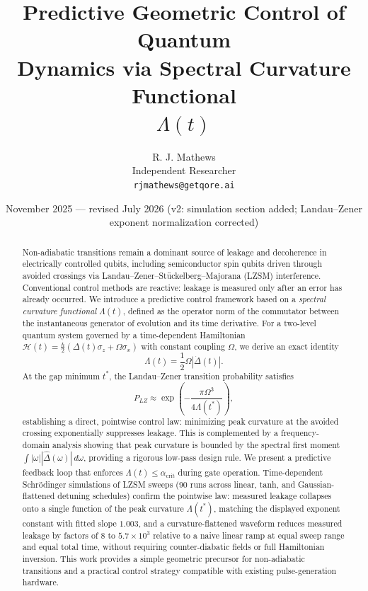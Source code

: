 \documentclass[11pt]{article}
\title{Predictive Geometric Control of Quantum\\
Dynamics via Spectral Curvature Functional\\
$\Lambda(t)$}
\author{R. J. Mathews\\
Independent Researcher\\
\texttt{rjmathews@getqore.ai}}
\date{November 2025 --- revised July 2026 (v2: simulation section added; Landau--Zener exponent normalization corrected)}
\begin{document}
\maketitle

\begin{abstract}
Non-adiabatic transitions remain a dominant source of leakage and decoherence in electrically controlled qubits, including semiconductor spin qubits driven through avoided crossings via Landau--Zener--St\"uckelberg--Majorana (LZSM) interference. Conventional control methods are reactive: leakage is measured only after an error has already occurred. We introduce a predictive control framework based on a \emph{spectral curvature functional} $\Lambda(t)$, defined as the operator norm of the commutator between the instantaneous generator of evolution and its time derivative. For a two-level quantum system governed by a time-dependent Hamiltonian $\mathcal{H}(t) = \frac{\hbar}{2}(\Delta(t)\sigma_z + \Omega \sigma_x)$ with constant coupling $\Omega$, we derive an exact identity
\[
    \Lambda(t) = \frac{1}{2}\Omega |\dot{\Delta}(t)|.
\]
At the gap minimum $t^*$, the Landau--Zener transition probability satisfies
\[
    P_{LZ} \approx \exp\left(-\frac{\pi\Omega^3}{4\Lambda(t^*)}\right),
\]
establishing a direct, pointwise control law: minimizing peak curvature at the avoided crossing exponentially suppresses leakage. This is complemented by a frequency-domain analysis showing that peak curvature is bounded by the spectral first moment $\int |\omega| |\hat{\Delta}(\omega)|\, d\omega$, providing a rigorous low-pass design rule. We present a predictive feedback loop that enforces $\Lambda(t) \le \alpha_{\mathrm{crit}}$ during gate operation. Time-dependent Schr\"odinger simulations of LZSM sweeps (90 runs across linear, tanh, and Gaussian-flattened detuning schedules) confirm the pointwise law: measured leakage collapses onto a single function of the peak curvature $\Lambda(t^*)$, matching the displayed exponent constant with fitted slope $1.003$, and a curvature-flattened waveform reduces measured leakage by factors of $8$ to $5.7\times 10^{3}$ relative to a naive linear ramp at equal sweep range and equal total time, without requiring counter-diabatic fields or full Hamiltonian inversion. This work provides a simple geometric precursor for non-adiabatic transitions and a practical control strategy compatible with existing pulse-generation hardware.
\end{abstract}

\end{document}
